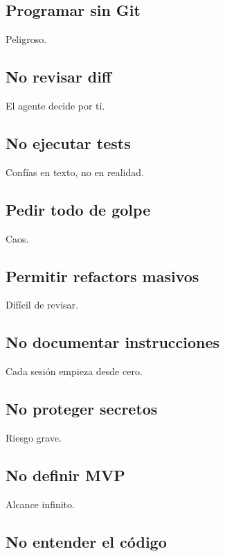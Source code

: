 \subsection{Programar sin Git}\label{programar-sin-git}

Peligroso.

\subsection{No revisar diff}\label{no-revisar-diff-1}

El agente decide por ti.

\subsection{No ejecutar tests}\label{no-ejecutar-tests}

Confías en texto, no en realidad.

\subsection{Pedir todo de golpe}\label{pedir-todo-de-golpe}

Caos.

\subsection{Permitir refactors
masivos}\label{permitir-refactors-masivos}

Difícil de revisar.

\subsection{No documentar
instrucciones}\label{no-documentar-instrucciones}

Cada sesión empieza desde cero.

\subsection{No proteger secretos}\label{no-proteger-secretos-1}

Riesgo grave.

\subsection{No definir MVP}\label{no-definir-mvp-1}

Alcance infinito.

\subsection{No entender el código}\label{no-entender-el-cuxf3digo}

